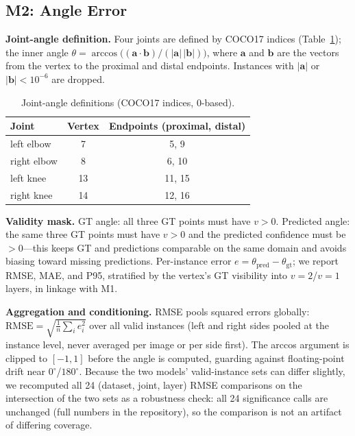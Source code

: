\documentclass[10pt,conference]{IEEEtran}
\begin{document}
\subsection{M2: Angle Error}

\textbf{Joint-angle definition.} Four joints are defined by COCO17 indices (Table~\ref{tab:joints}); the inner angle $\theta=\arccos\big((\mathbf{a}\cdot\mathbf{b})/(|\mathbf{a}|\,|\mathbf{b}|)\big)$, where $\mathbf{a}$ and $\mathbf{b}$ are the vectors from the vertex to the proximal and distal endpoints. Instances with $|\mathbf{a}|$ or $|\mathbf{b}|<10^{-6}$ are dropped.

\begin{table}[t]
\centering
\caption{Joint-angle definitions (COCO17 indices, 0-based).}
\label{tab:joints}
\renewcommand{\arraystretch}{1.15}
\begin{tabular}{lcc}
\toprule
\textbf{Joint} & \textbf{Vertex} & \textbf{Endpoints (proximal, distal)} \\
\midrule
left elbow & 7 & 5, 9 \\
right elbow & 8 & 6, 10 \\
left knee & 13 & 11, 15 \\
right knee & 14 & 12, 16 \\
\bottomrule
\end{tabular}
\end{table}

\textbf{Validity mask.} GT angle: all three GT points must have $v>0$. Predicted angle: the same three GT points must have $v>0$ and the predicted confidence must be $>0$---this keeps GT and predictions comparable on the same domain and avoids biasing toward missing predictions. Per-instance error $e=\theta_{\mathrm{pred}}-\theta_{\mathrm{gt}}$; we report RMSE, MAE, and P95, stratified by the vertex's GT visibility into $v{=}2$/$v{=}1$ layers, in linkage with M1.

\textbf{Aggregation and conditioning.} RMSE pools squared errors globally: $\mathrm{RMSE}=\sqrt{\frac{1}{n}\sum_i e_i^2}$ over all valid instances (left and right sides pooled at the instance level, never averaged per image or per side first). The arccos argument is clipped to $[-1,1]$ before the angle is computed, guarding against floating-point drift near $0^{\circ}$/$180^{\circ}$. Because the two models' valid-instance sets can differ slightly, we recomputed all 24 (dataset, joint, layer) RMSE comparisons on the intersection of the two sets as a robustness check: all 24 significance calls are unchanged (full numbers in the repository), so the comparison is not an artifact of differing coverage.
\end{document}
